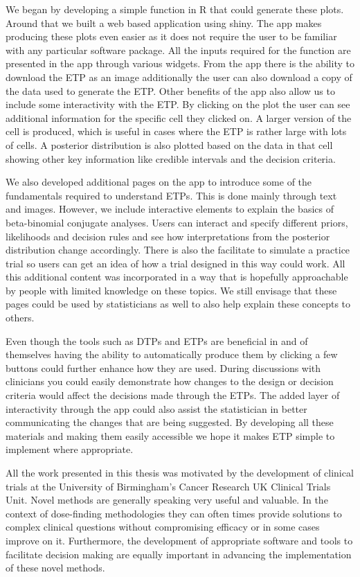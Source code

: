 We began by developing a simple function in R that could generate these plots. Around that we built a web based application using shiny. The app makes producing these plots even easier as it does not require the user to be familiar with any particular software package. All the inputs required for the function are presented in the app through various widgets. From the app there is the ability to download the ETP as an image additionally the user can also download a copy of the data used to generate the ETP. Other benefits of the app also allow us to include some interactivity with the ETP. By clicking on the plot the user can see additional information for the specific cell they clicked on. A larger version of the cell is produced, which is useful in cases where the ETP is rather large with lots of cells. A posterior distribution is also plotted based on the data in that cell showing other key information like credible intervals and the decision criteria.   

We also developed additional pages on the app to introduce some of the fundamentals required to understand ETPs. This is done mainly through text and images. However, we include interactive elements to explain the basics of beta-binomial conjugate analyses. Users can interact and specify different priors, likelihoods and decision rules and see how interpretations from the posterior distribution change accordingly. There is also the facilitate to simulate a practice trial so users can get an idea of how a trial designed in this way could work. All this additional content was incorporated in a way that is hopefully approachable by people with limited knowledge on these topics. We still envisage that these pages could be used by statisticians as well to also help explain these concepts to others. 

Even though the tools such as DTPs and ETPs are beneficial in and of themselves having the ability to automatically produce them by clicking a few buttons could further enhance how they are used. During discussions with clinicians you could easily demonstrate how changes to the design or decision criteria would affect the decisions made through the ETPs. The added layer of interactivity through the app could also assist the statistician in better communicating the changes that are being suggested. By developing all these materials and making them easily accessible we hope it makes ETP simple to implement where appropriate.

All the work presented in this thesis was motivated by the development of clinical trials at the University of Birmingham's Cancer Research UK Clinical Trials Unit. Novel methods are generally speaking very useful and valuable. In the context of dose-finding methodologies they can often times provide solutions to complex clinical questions without compromising efficacy or in some cases improve on it. Furthermore, the development of appropriate software and tools to facilitate decision making are equally important in advancing the implementation of these novel methods.  